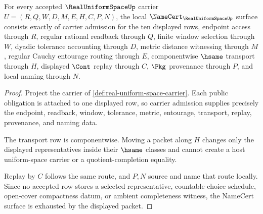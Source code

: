 \begin{theorem}
\label{thm:real-uniform-space-namecert-obligations}
For every accepted $\RealUniformSpaceUp$ carrier $U=(R,Q,W,D,M,E,H,C,P,N)$, the local $\NameCert_{\RealUniformSpaceUp}$ surface consists exactly of carrier admission for the ten displayed rows, endpoint access through $R$, regular rational readback through $Q$, finite window selection through $W$, dyadic tolerance accounting through $D$, metric distance witnessing through $M$, regular Cauchy entourage routing through $E$, componentwise $\hsame$ transport through $H$, displayed $\Cont$ replay through $C$, $\Pkg$ provenance through $P$, and local naming through $N$.
\end{theorem}
\begin{proof}
Project the carrier of \autoref{def:real-uniform-space-carrier}. Each public obligation is attached to one displayed row, so carrier admission supplies precisely the endpoint, readback, window, tolerance, metric, entourage, transport, replay, provenance, and naming data.

The transport row is componentwise. Moving a packet along $H$ changes only the displayed representatives inside their $\hsame$ classes and cannot create a host uniform-space carrier or a quotient-completion equality.

Replay by $C$ follows the same route, and $P,N$ source and name that route locally. Since no accepted row stores a selected representative, countable-choice schedule, open-cover compactness datum, or ambient completeness witness, the NameCert surface is exhausted by the displayed packet.
\end{proof}

